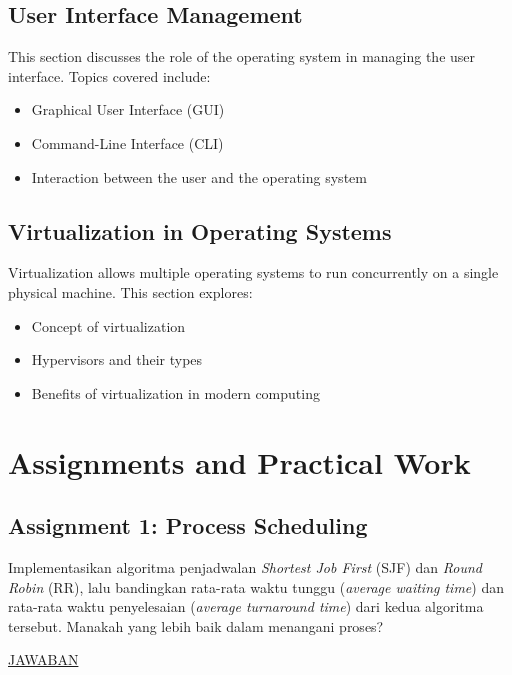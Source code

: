 \documentclass[12pt]{article}
\begin{document}
\subsection{User Interface Management}
This section discusses the role of the operating system in managing the user interface. Topics covered include:
\begin{itemize}
    \item Graphical User Interface (GUI)
    \item Command-Line Interface (CLI)
    \item Interaction between the user and the operating system
\end{itemize}

\subsection{Virtualization in Operating Systems}
Virtualization allows multiple operating systems to run concurrently on a single physical machine. This section explores:
\begin{itemize}
    \item Concept of virtualization
    \item Hypervisors and their types
    \item Benefits of virtualization in modern computing
\end{itemize}


\section{Assignments and Practical Work}
\subsection{Assignment 1: Process Scheduling}
\hspace*{1cm} Implementasikan algoritma penjadwalan \textit{Shortest Job First} (SJF) dan \textit{Round Robin} (RR), lalu bandingkan rata-rata waktu tunggu (\textit{average waiting time}) dan rata-rata waktu penyelesaian (\textit{average turnaround time}) dari kedua algoritma tersebut. Manakah yang lebih baik dalam menangani proses? 
\newline
\newline

\begin{center}
    \underline{JAWABAN}
\end{center}
\end{document}
